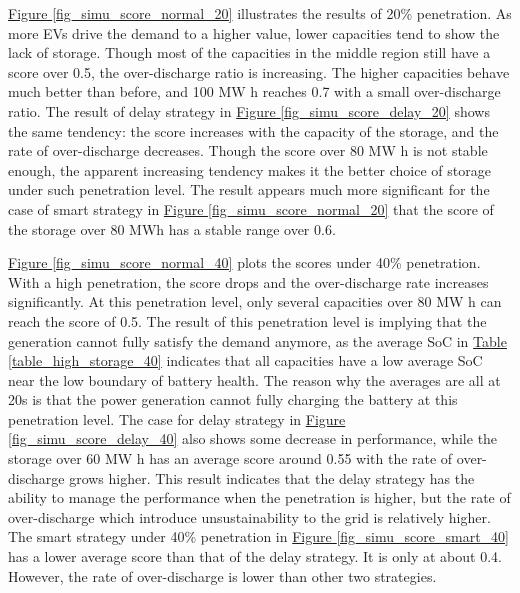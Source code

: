 \documentclass[12pt,a4paper]{report}
\begin{document}
        \hyperref[fig_simu_score_normal_20]{Figure \ref*{fig_simu_score_normal_20}} illustrates the results of 20\% penetration. As more EVs drive the demand to a higher value, lower capacities tend to show the lack of storage. Though most of the capacities in the middle region still have a score over 0.5, the over-discharge ratio is increasing. The higher capacities behave much better than before, and 100 MW h reaches 0.7 with a small over-discharge ratio.
        The result of delay strategy in \hyperref[fig_simu_score_delay_20]{Figure \ref*{fig_simu_score_delay_20}} shows the same tendency: the score increases with the capacity of the storage, and the rate of over-discharge decreases. Though the score over 80 MW h is not stable enough, the apparent increasing tendency makes it the better choice of storage under such penetration level.
        The result appears much more significant for the case of smart strategy in \hyperref[fig_simu_score_normal_20]{Figure \ref*{fig_simu_score_normal_20}} that the score of the storage over 80 MWh has a stable range over 0.6.
            
        \hyperref[fig_simu_score_normal_40]{Figure \ref*{fig_simu_score_normal_40}} plots the scores under 40\% penetration. With a high penetration, the score drops and the over-discharge rate increases significantly. At this penetration level, only several capacities over 80 MW h can reach the score of 0.5. The result of this penetration level is implying that the generation cannot fully satisfy the demand anymore, as the average SoC in \hyperref[table_high_storage_40]{Table \ref*{table_high_storage_40}} indicates that all capacities have a low average SoC near the low boundary of battery health. The reason why the averages are all at 20s is that the power generation cannot fully charging the battery at this penetration level.
        The case for delay strategy in \hyperref[fig_simu_score_delay_40]{Figure \ref*{fig_simu_score_delay_40}} also shows some decrease in performance, while the storage over 60 MW h has an average score around 0.55 with the rate of over-discharge grows higher. This result indicates that the delay strategy has the ability to manage the performance when the penetration is higher, but the rate of over-discharge which introduce unsustainability to the grid is relatively higher.
        The smart strategy under 40\% penetration in \hyperref[fig_simu_score_smart_40]{Figure \ref*{fig_simu_score_smart_40}} has a lower average score than that of the delay strategy. It is only at about 0.4. However, the rate of over-discharge is lower than other two strategies.
\end{document}
